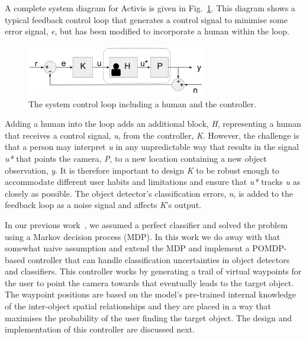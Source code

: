 \documentclass[runningheads]{llncs}
\begin{document}
A complete system diagram for Activis is given in Fig.~\ref{fig:sys-diagram}. 
This diagram shows a typical feedback control loop that generates a control signal to minimise some error signal, \emph{e}, but has been modified to incorporate a human within the loop.

\begin{figure}
  \centering
  \includegraphics[width=0.7\textwidth]{figures/control_loop.png}
  \caption{The system control loop including a human and the controller.}\label{fig:sys-diagram}
\end{figure}

Adding a human into the loop adds an additional block, \emph{H}, representing a human that receives a control signal, \emph{u}, from the controller, \emph{K}. 
However, the challenge is that a person may interpret \emph{u} in any unpredictable way that results in the signal \emph{u*} that points the camera, \emph{P}, to a new location containing a new object observation, \emph{y}.
It is therefore important to design \emph{K} to be robust enough to accommodate different user habits and limitations and ensure that \emph{u*} tracks \emph{u} as closely as possible. 
The object detector's classification errors, \emph{n}, is added to the feedback loop as a noise signal and affects \emph{K}'s output.

In our previous work~\cite{lock2019active}, we assumed a perfect classifier and solved the problem using a Markov decision process (MDP). 
In this work we do away with that somewhat naive assumption and extend the MDP and implement a POMDP-based controller that can handle classification uncertainties in object detectors and classifiers. 
This controller works by generating a trail of virtual waypoints for the user to point the camera towards that eventually leads to the target object.
The waypoint positions are based on the model's pre-trained internal knowledge of the inter-object spatial relationships and they are placed in a way that maximises the probability of the user finding the target object.
The design and implementation of this controller are discussed next.
\end{document}
